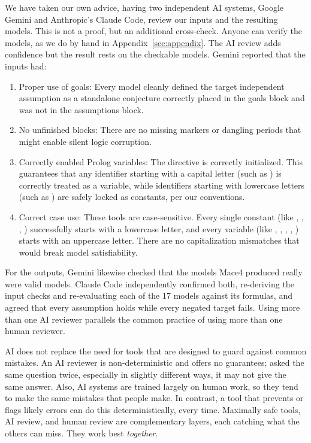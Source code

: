 We have taken our own advice, having two independent AI systems, Google Gemini and Anthropic's Claude Code, review our inputs and the resulting models. This is not a proof, but an additional cross-check. Anyone can verify the models, as we do by hand in Appendix~\ref{sec:appendix}. The AI review adds confidence but the result rests on the checkable models. Gemini reported that the inputs had:

\begin{enumerate}
	\item Proper use of goals: Every model cleanly defined the target independent assumption as a standalone conjecture correctly placed in the goals block and was not in the assumptions block.
	\item No unfinished blocks: There are no missing  markers or dangling periods that might enable silent logic corruption.
	\item Correctly enabled Prolog variables: The directive  is correctly initialized. This guarantees that any identifier starting with a capital letter (such as ) is correctly treated as a variable, while identifiers starting with lowercase letters (such as ) are safely locked as constants, per our conventions.
	\item Correct case use: These tools are case-sensitive. Every single constant (like , , , ) successfully starts with a lowercase letter, and every variable (like , , , , ) starts with an uppercase letter. There are no capitalization mismatches that would break model satisfiability.
\end{enumerate}

For the outputs, Gemini likewise checked that the models Mace4 produced really were valid models. Claude Code independently confirmed both, re-deriving the input checks and re-evaluating each of the 17 models against its formulas, and agreed that every assumption holds while every negated target fails. Using more than one AI reviewer parallels the common practice of using more than one human reviewer.

AI does not replace the need for tools that are designed to guard against common mistakes. An AI reviewer is non-deterministic and offers no guarantees; asked the same question twice, especially in slightly different ways, it may not give the same answer. Also, AI systems are trained largely on human work, so they tend to make the same mistakes that people make. In contrast, a tool that prevents or flags likely errors can do this deterministically, every time. Maximally safe tools, AI review, and human review are complementary layers, each catching what the others can miss. They work best \emph{together}.


